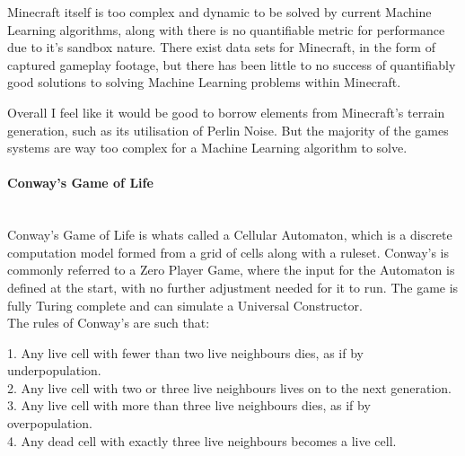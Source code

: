 \begin{flushleft}
                        Minecraft itself is too complex and dynamic to be solved by current Machine Learning algorithms, along with there is no quantifiable 
                        metric for performance due to it's sandbox nature. There exist data sets for Minecraft, in the form of captured gameplay footage, but
                        there has been little to no success of quantifiably good solutions to solving Machine Learning problems within Minecraft. \\

                        \vspace{0.2cm}

                        Overall I feel like it would be good to borrow elements from Minecraft's terrain generation, such as its utilisation of Perlin Noise.
                        But the majority of the games systems are way too complex for a Machine Learning algorithm to solve. \\

                        \vspace{1cm}
                    \paragraph{Conway's Game of Life} \mbox{} \\
                        \vspace{0.2cm}
                        Conway's Game of Life is whats called a Cellular Automaton, which is a discrete computation model formed from a grid of cells along with 
                        a ruleset. Conway's is commonly referred to a Zero Player Game, where the input for the Automaton is defined at the start, with no
                        further adjustment needed for it to run. The game is fully Turing complete and can simulate a Universal Constructor. \\
                        \vspace{0.2cm}
                        The rules of Conway's are such that: \\

                        
                        \begin{center}
                            \normalsize
                            1. Any live cell with fewer than two live neighbours dies, as if by underpopulation. \\
                            2. Any live cell with two or three live neighbours lives on to the next generation. \\
                            3. Any live cell with more than three live neighbours dies, as if by overpopulation. \\
                            4. Any dead cell with exactly three live neighbours becomes a live cell. \\
                        \end{center}


\end{flushleft}
